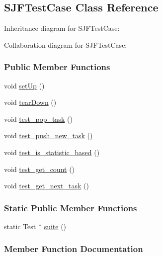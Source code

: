 \hypertarget{a00081}{}\subsection{S\+J\+F\+Test\+Case Class Reference}
\label{a00081}


Inheritance diagram for S\+J\+F\+Test\+Case\+:


Collaboration diagram for S\+J\+F\+Test\+Case\+:
\subsubsection*{Public Member Functions}
\begin{DoxyCompactItemize}
\item 
void \hyperlink{a00081_a60802b4d079974043d4e3baef703bcd1}{set\+Up} ()
\item 
void \hyperlink{a00081_a5d9d9367be49a961f6b4babce4fd1fa6}{tear\+Down} ()
\item 
void \hyperlink{a00081_a8a60cf0b180bbfa45cc87a390e9feea2}{test\+\_\+pop\+\_\+task} ()
\item 
void \hyperlink{a00081_acb01215c03c9c2d1d106c50256072128}{test\+\_\+push\+\_\+new\+\_\+task} ()
\item 
void \hyperlink{a00081_ad1e7aef024b053a300dbf57884e8e21b}{test\+\_\+is\+\_\+statistic\+\_\+based} ()
\item 
void \hyperlink{a00081_abdef7d1c7d5d42959626b05bb5cde82d}{test\+\_\+get\+\_\+count} ()
\item 
void \hyperlink{a00081_a7953aefbd4ff5f4af75b2de09e8bb91f}{test\+\_\+get\+\_\+next\+\_\+task} ()
\end{DoxyCompactItemize}
\subsubsection*{Static Public Member Functions}
\begin{DoxyCompactItemize}
\item 
static Test $\ast$ \hyperlink{a00081_ab7356943d18befb6e383b68857093503}{suite} ()
\end{DoxyCompactItemize}


\subsubsection{Member Function Documentation}
\hypertarget{a00081_a60802b4d079974043d4e3baef703bcd1}{}
